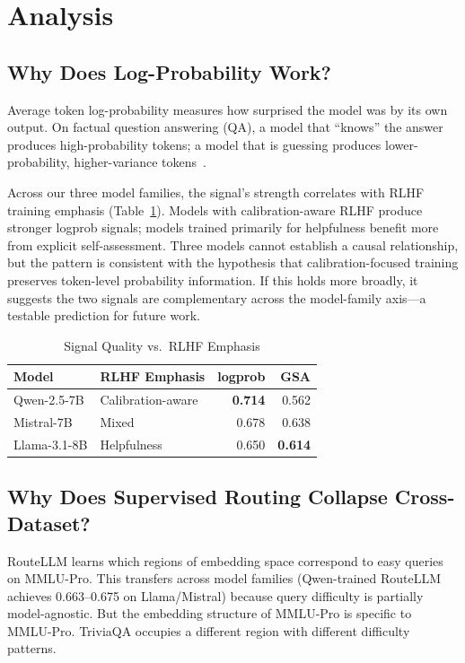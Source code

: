 \documentclass[journal]{IEEEtran}
\begin{document}
\section{Analysis}
\label{sec:analysis}

\subsection{Why Does Log-Probability Work?}
\label{sec:analysis-logprob}

Average token log-probability measures how surprised the model was by its own output. On factual question answering (QA), a model that ``knows'' the answer produces high-probability tokens; a model that is guessing produces lower-probability, higher-variance tokens~\cite{kadavath2022language}.

Across our three model families, the signal's strength correlates with RLHF training emphasis (Table~\ref{tab:rlhf}). Models with calibration-aware RLHF produce stronger logprob signals; models trained primarily for helpfulness benefit more from explicit self-assessment. Three models cannot establish a causal relationship, but the pattern is consistent with the hypothesis that calibration-focused training preserves token-level probability information. If this holds more broadly, it suggests the two signals are complementary across the model-family axis---a testable prediction for future work.

\begin{table}[t]
\centering
\caption{Signal Quality vs.\ RLHF Emphasis}
\label{tab:rlhf}
\begin{tabular}{llrr}
\toprule
Model & RLHF Emphasis & logprob & GSA \\
\midrule
Qwen-2.5-7B & Calibration-aware & \textbf{0.714} & 0.562 \\
Mistral-7B & Mixed & 0.678 & 0.638 \\
Llama-3.1-8B & Helpfulness & 0.650 & \textbf{0.614} \\
\bottomrule
\end{tabular}
\end{table}

\subsection{Why Does Supervised Routing Collapse Cross-Dataset?}

RouteLLM learns which regions of embedding space correspond to easy queries on MMLU-Pro. This transfers across model families (Qwen-trained RouteLLM achieves 0.663--0.675 on Llama/Mistral) because query difficulty is partially model-agnostic. But the embedding structure of MMLU-Pro is specific to MMLU-Pro. TriviaQA occupies a different region with different difficulty patterns.
\end{document}
